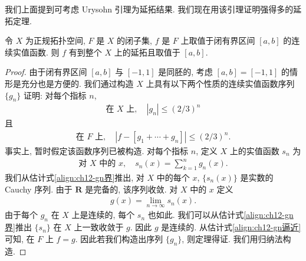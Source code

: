 \documentclass[../../main.tex]{subfiles}
\begin{document}
我们上面提到可考虑 Urysohn 引理为延拓结果. 我们现在用该引理证明强得多的延拓定理.

\begin{theorem}\label{theorem:ch12-Tietze}
令 $X$ 为正规拓扑空间, $F$ 是 $X$ 的闭子集, $f$ 是 $F$ 上取值于闭有界区间 $[a,b]$ 的连续实值函数. 则 $f$ 有到整个 $X$ 上的延拓且取值于 $[a,b]$.
\end{theorem}

\begin{proof}
由于闭有界区间 $[a,b]$ 与 $[-1,1]$ 是同胚的, 考虑 $[a,b]=[-1,1]$ 的情形是充分也是方便的. 我们通过构造 $X$ 上具有以下两个性质的连续实值函数序列 $\{g_{n}\}$ 证明: 对每个指标 $n$,
\begin{align}
\text{在 }X\text{ 上},\quad |g_{n}|\leqslant(2/3)^{n}\label{align:ch12-gn界}
\end{align}
且
\begin{align}
\text{在 }F\text{ 上},\quad |f-[g_{1}+\cdots+g_{n}]|\leqslant(2/3)^{n}.\label{align:ch12-gn逼近}
\end{align}
事实上, 暂时假定该函数序列已被构造. 对每个指标 $n$, 定义 $X$ 上的实值函数 $s_{n}$ 为
\begin{align*}
\text{对 }X\text{ 中的 }x,\quad s_{n}(x)=\sum_{k=1}^{n}g_{n}(x).
\end{align*}
我们从估计式\eqref{align:ch12-gn界}推出, 对 $X$ 中的每个 $x$, $\{s_{n}(x)\}$ 是实数的 Cauchy 序列. 由于 $\mathbf{R}$ 是完备的, 该序列收敛. 对 $X$ 中的 $x$ 定义
\begin{align*}
g(x)=\lim_{n\to\infty}s_{n}(x).
\end{align*}
由于每个 $g_{n}$ 在 $X$ 上是连续的, 每个 $s_{n}$ 也如此. 我们可以从估计式\eqref{align:ch12-gn界}推出 $\{s_{n}\}$ 在 $X$ 上一致收敛于 $g$. 因此 $g$ 是连续的. 从估计式\eqref{align:ch12-gn逼近}可知, 在 $F$ 上 $f=g$. 因此若我们构造出序列 $\{g_{n}\}$, 则定理得证. 我们用归纳法构造.


\end{proof}
\end{document}
